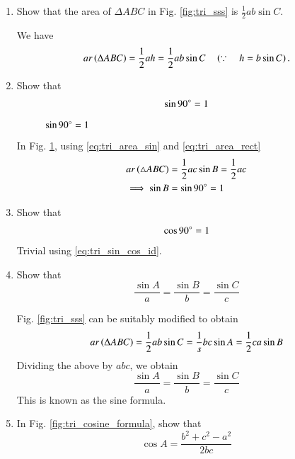 \renewcommand{\theequation}{\theenumi}
\begin{enumerate}[label=\arabic*.,ref=\thesubsection.\theenumi]

\item
\label{prob:tri_area_sin}
	Show that the area of $\Delta ABC$ in Fig. 	\ref{fig:tri_sss}	is $\frac{1}{2}ab \sin C$.

\solution We have
%
\begin{equation}
ar\left(\Delta ABC\right) = \frac{1}{2}ah = \frac{1}{2}ab\sin C \quad \left(\because \quad h = b \sin C\right).
\label{eq:tri_area_sin}
\end{equation}
%
\item Show that
\begin{align}
\label{eq:sin90}
\sin 90 \degree = 1
\end{align}
%
\begin{figure}[!ht]
\centering
\resizebox{\columnwidth}{!}{}
\caption{$\sin 90\degree = 1$}
\label{fig:tri_right_angle_area}	
\end{figure}

\solution In Fig. \ref{fig:tri_right_angle_area}, 
using \eqref{eq:tri_area_sin} and \eqref{eq:tri_area_rect}
\begin{align}
ar \left(\triangle ABC\right) &= \frac{1}{2}ac \sin B = \frac{1}{2}ac
\\
\implies \sin B &= \sin 90\degree = 1
\end{align}
%
\item Show that
\begin{align}
\label{eq:cos90}
\cos 90 \degree = 1
\end{align}
%
\solution Trivial using \eqref{eq:tri_sin_cos_id}.


\item
	Show that 
	\begin{equation}
	\frac{\sin A}{a} = \frac{\sin B}{b} = \frac{\sin C}{c}
	\end{equation}

\solution Fig. \ref{fig:tri_sss} can be suitably modified to obtain 
\begin{equation}
ar\left(\Delta ABC\right) = \frac{1}{2}ab\sin C = \frac{1}{s}bc\sin A = \frac{1}{2}ca\sin B
\end{equation}
Dividing the above by $abc$, we obtain
	\begin{equation}
\label{eq:tri_sin_form}
	\frac{\sin A}{a} = \frac{\sin B}{b} = \frac{\sin C}{c}
	\end{equation}
This is known as the sine formula.	
%
\item
In Fig. \ref{fig:tri_cosine_formula}, show that
%
\begin{equation}
\label{eq:tri_cos_form}
\cos A = \frac{b^2+c^2-a^2}{2bc}
\end{equation}
%
\


\end{enumerate}
